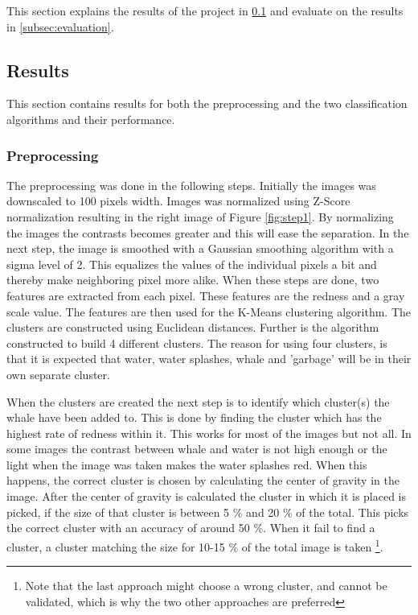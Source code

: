 This section explains the results of the project in \ref{subsec:results} and evaluate on the results in \ref{subsec:evaluation}.

\subsection{Results}
\label{subsec:results}
This section contains results for both the preprocessing and the two classification algorithms and their performance.

\subsubsection{Preprocessing}
The preprocessing was done in the following steps.
Initially the images was downscaled to 100 pixels width.
Images was normalized using Z-Score normalization resulting in the right image of Figure \ref{fig:step1}. By normalizing the images the contrasts becomes greater and this will ease the separation.
In the next step, the image is smoothed with a Gaussian smoothing algorithm with a sigma level of 2. This equalizes the values of the individual pixels a bit and thereby make neighboring pixel more alike.
When these steps are done, two features are extracted from each pixel.
These features are the redness and a gray scale value.
The features are then used for the K-Means clustering algorithm.
The clusters are constructed using Euclidean distances. Further is the algorithm constructed to build 4 different clusters.
The reason for using four clusters, is that it is expected that water, water splashes, whale and 'garbage' will be in their own separate cluster.

When the clusters are created the next step is to identify which cluster(s) the whale have been added to.
This is done by finding the cluster which has the highest rate of redness within it. This works for most of the images but not all. In some images the contrast between whale and water is not high enough or the light when the image was taken makes the water splashes red. When this happens, the correct cluster is chosen by calculating the center of gravity in the image. After the center of gravity is calculated the cluster in which it is placed is picked, if the size of that cluster is between 5 \% and 20 \% of the total. This picks the correct cluster with an accuracy of around 50 \%.
When it fail to find a cluster, a cluster matching the size for 10-15 \% of the total image is taken \footnote{Note that the last approach might choose a wrong cluster, and cannot be validated, which is why the two other approaches are preferred}. 

